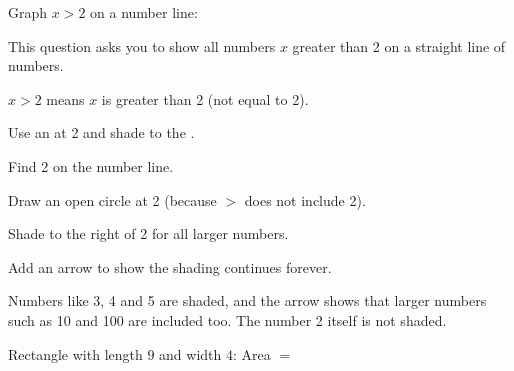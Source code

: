 
Graph $x > 2$ on a number line:


This question asks you to show all numbers $x$ greater than 2 on a straight line
of numbers.

\begin{words}
  \item $x > 2$ means $x$ is greater than 2 (not equal to 2).
  \item Use an at 2 and shade to the .
\end{words}

\begin{steps}
  \item Find 2 on the number line.
  \item Draw an open circle at 2 (because $>$ does not include 2).
  \item Shade to the right of 2 for all larger numbers.
  \item Add an arrow to show the shading continues forever.
        \begin{center}
        \end{center}
\end{steps}


Numbers like 3, 4 and 5 are shaded, and the arrow shows that larger numbers
such as 10 and 100 are included too. The number 2 itself is not shaded.



Rectangle with length $9$ and width $4$: Area $= $\ansblank


